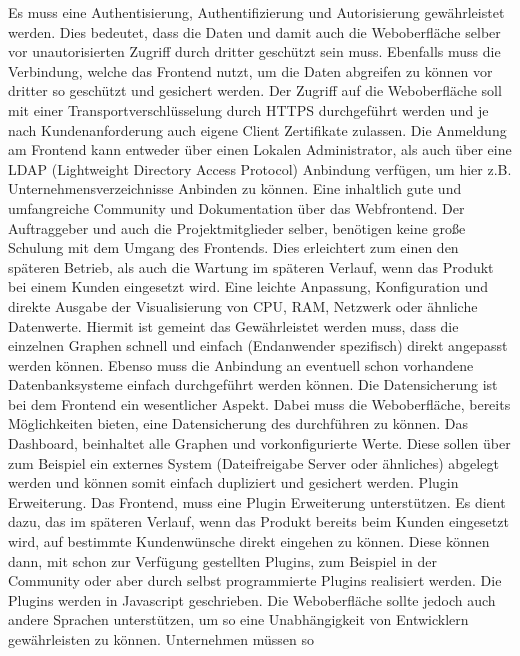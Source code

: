 \begin{outline}
  \1 Es muss eine Authentisierung, Authentifizierung und Autorisierung
  gewährleistet werden. Dies bedeutet, dass die Daten und damit auch die
  Weboberfläche selber vor unautorisierten Zugriff durch dritter geschützt sein
  muss. Ebenfalls muss die Verbindung, welche das Frontend nutzt, um die Daten
  abgreifen zu können vor dritter so geschützt und gesichert werden. Der
  Zugriff auf die Weboberfläche soll mit einer Transportverschlüsselung durch
  \gls{HTTPS} durchgeführt werden und je nach Kundenanforderung auch eigene
  Client Zertifikate zulassen. Die Anmeldung am Frontend kann entweder über
  einen Lokalen Administrator, als auch über eine LDAP (Lightweight Directory
  Access Protocol) Anbindung verfügen, um hier z.B. Unternehmensverzeichnisse
  Anbinden zu können.
  \1 Eine inhaltlich gute und umfangreiche Community und Dokumentation über das
  Webfrontend. Der Auftraggeber und auch die Projektmitglieder selber,
  benötigen keine große Schulung mit dem Umgang des Frontends. Dies erleichtert
  zum einen den späteren Betrieb, als auch die Wartung im späteren Verlauf,
  wenn das Produkt bei einem Kunden eingesetzt wird.
  \1 Eine leichte Anpassung, Konfiguration und direkte Ausgabe der
  Visualisierung von CPU, RAM, Netzwerk oder ähnliche Datenwerte. Hiermit ist
  gemeint das Gewährleistet werden muss, dass  die einzelnen Graphen schnell
  und einfach (Endanwender spezifisch) direkt angepasst werden können. Ebenso
  muss die Anbindung an eventuell schon vorhandene Datenbanksysteme einfach
  durchgeführt werden können.
  \1 Die Datensicherung ist bei dem Frontend ein wesentlicher Aspekt. Dabei
  muss die Weboberfläche, bereits Möglichkeiten bieten, eine Datensicherung des
   durchführen zu können.  Das Dashboard,
  beinhaltet alle Graphen und vorkonfigurierte Werte. Diese sollen über zum
  Beispiel ein externes System (Dateifreigabe Server oder ähnliches) abgelegt
  werden und können somit einfach dupliziert und gesichert werden.
  \1 Plugin Erweiterung. Das Frontend, muss eine Plugin Erweiterung
  unterstützen. Es dient dazu, das im späteren Verlauf, wenn das Produkt
  bereits beim Kunden eingesetzt wird, auf bestimmte Kundenwünsche direkt
  eingehen zu können. Diese können dann, mit schon zur Verfügung gestellten
  Plugins, zum Beispiel in der Community oder aber durch selbst programmierte
  Plugins realisiert werden. Die Plugins werden in Javascript geschrieben. Die
  Weboberfläche sollte jedoch auch andere Sprachen unterstützen, um so eine
  Unabhängigkeit von Entwicklern gewährleisten zu können. Unternehmen müssen so

\end{outline}
